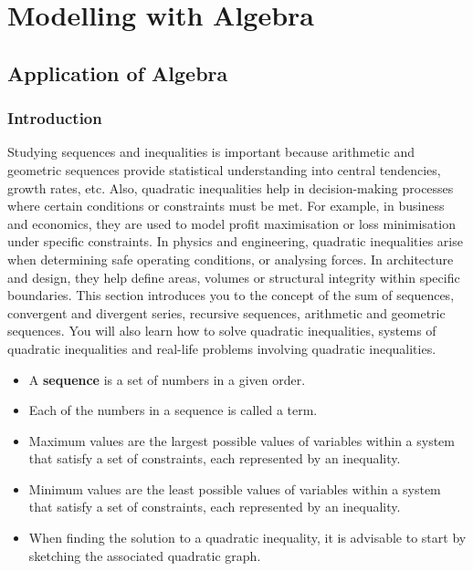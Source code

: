 \section*{Modelling with Algebra}
\subsection*{Application of Algebra}

\subsubsection*{Introduction}

Studying sequences and inequalities is important because arithmetic and
geometric sequences provide statistical understanding into central tendencies,
growth rates, etc. Also, quadratic inequalities help in decision-making processes
where certain conditions or constraints must be met. For example, in business
and economics, they are used to model profit maximisation or loss minimisation
under specific constraints. In physics and engineering, quadratic inequalities arise
when determining safe operating conditions, or analysing forces. In architecture
and design, they help define areas, volumes or structural integrity within specific
boundaries. This section introduces you to the concept of the sum of sequences,
convergent and divergent series, recursive sequences, arithmetic and geometric
sequences. You will also learn how to solve quadratic inequalities, systems of
quadratic inequalities and real-life problems involving quadratic inequalities.

\begin{keyideas}
\begin{itemize}
  \item A \textbf{sequence} is a set of numbers in a given order.
  \item Each of the numbers in a sequence is called a term.
  \item Maximum values are the largest possible values of variables within a
  system that satisfy a set of constraints, each represented by an inequality.
  \item Minimum values are the least possible values of variables within a system
  that satisfy a set of constraints, each represented by an inequality.
  \item When finding the solution to a quadratic inequality, it is advisable to start
  by sketching the associated quadratic graph.
\end{itemize}
\end{keyideas}
